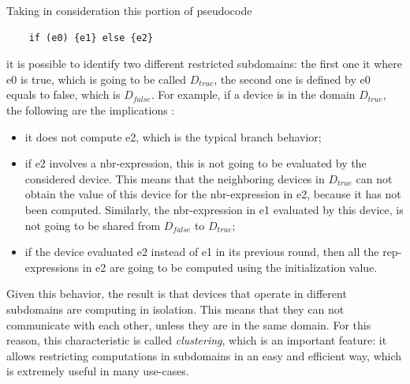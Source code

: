 Taking in consideration this portion of pseudocode
\begin{lstlisting}
    if (e0) {e1} else {e2}
\end{lstlisting}
it is possible to identify two different restricted subdomains: the first one it where e0 is true, which is going to be called $D_{true}$, the second one is defined by e0 equals to false, which is $D_{false}$.
For example, if a device is in the domain $D_{true}$, the following are the implications \cite{computational_fields_theory}:
\begin{itemize}
    \item it does not compute e2, which is the typical branch behavior;
    \item if e2 involves a nbr-expression, this is not going to be evaluated by the considered device. This means that the neighboring devices in $D_{true}$ can not obtain the value of this device for the nbr-expression in e2, because it has not been computed. Similarly, the nbr-expression in e1 evaluated by this device, is not going to be shared from $D_{false}$ to $D_{true}$;
    \item if the device evaluated e2 instead of e1 in its previous round, then all the rep-expressions in e2 are going to be computed using the initialization value.
\end{itemize}

Given this behavior, the result is that devices that operate in different subdomains are computing in isolation. This means that they can not communicate with each other, unless they are in the same domain. For this reason, this characteristic is called \textit{clustering}, which is an important feature: it allows restricting computations in subdomains in an easy and efficient way, which is extremely useful in many use-cases.

